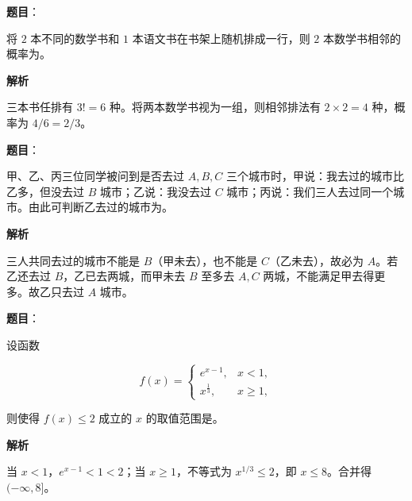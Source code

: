 \begin{answer}

\textbf{题目}：

将 $2$ 本不同的数学书和 $1$ 本语文书在书架上随机排成一行，则 $2$ 本数学书相邻的概率为\gkblank{}。

\textbf{解析}

三本书任排有 $3!=6$ 种。将两本数学书视为一组，则相邻排法有 $2\times2=4$ 种，概率为 $4/6=2/3$。


\end{answer}
\begin{answer}

\textbf{题目}：

甲、乙、丙三位同学被问到是否去过 $A,B,C$ 三个城市时，甲说：我去过的城市比乙多，但没去过 $B$ 城市；乙说：我没去过 $C$ 城市；丙说：我们三人去过同一个城市。由此可判断乙去过的城市为\gkblank{}。

\textbf{解析}

三人共同去过的城市不能是 $B$（甲未去），也不能是 $C$（乙未去），故必为 $A$。若乙还去过 $B$，乙已去两城，而甲未去 $B$ 至多去 $A,C$ 两城，不能满足甲去得更多。故乙只去过 $A$ 城市。


\end{answer}
\begin{answer}

\textbf{题目}：

设函数

\nopagebreak[4]
\[
f(x)=\begin{cases}
e^{x-1},&x<1,\\
x^{\frac13},&x\geqslant1,
\end{cases}
\]

则使得 $f(x)\leqslant2$ 成立的 $x$ 的取值范围是\gkblank{}。

\textbf{解析}

当 $x<1$，$e^{x-1}<1<2$；当 $x\geqslant1$，不等式为 $x^{1/3}\leqslant2$，即 $x\leqslant8$。合并得 $(-\infty,8]$。

\gkanswer{答案：$(-\infty,8]$}

\end{answer}

